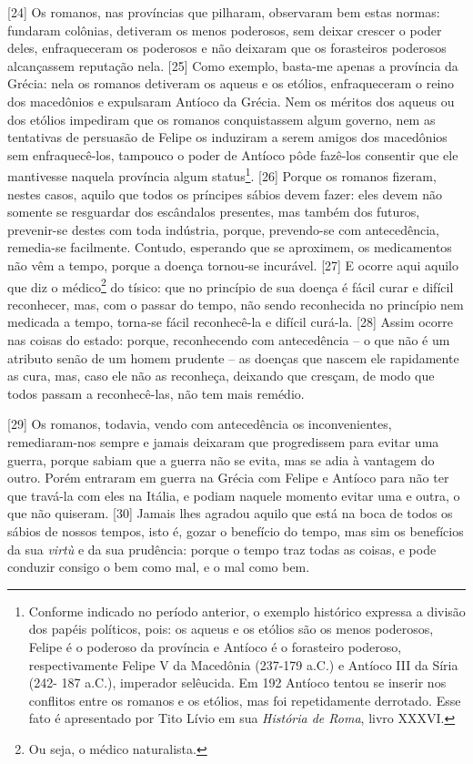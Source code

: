 {[}24{]} Os romanos, nas províncias que pilharam, observaram bem estas
normas: fundaram colônias, detiveram os menos poderosos, sem deixar
crescer o poder deles, enfraqueceram os poderosos e não deixaram que os
forasteiros poderosos alcançassem reputação nela. {[}25{]} Como exemplo,
basta-me apenas a província da Grécia: nela os romanos detiveram os
aqueus e os etólios, enfraqueceram o reino dos macedônios e expulsaram
Antíoco da Grécia. Nem os méritos dos aqueus ou dos etólios impediram
que os romanos conquistassem algum governo, nem as tentativas de
persuasão de Felipe os induziram a serem amigos dos macedônios sem
enfraquecê-los, tampouco o poder de Antíoco pôde fazê-los consentir que
ele mantivesse naquela província algum status\footnote{Conforme indicado
  no período anterior, o exemplo histórico expressa a divisão dos papéis
  políticos, pois: os aqueus e os etólios são os menos poderosos, Felipe
  é o poderoso da província e Antíoco é o forasteiro poderoso,
  respectivamente Felipe V da Macedônia (237-179 a.C.) e Antíoco III da
  Síria (242- 187 a.C.), imperador selêucida. Em 192 Antíoco tentou se
  inserir nos conflitos entre os romanos e os etólios, mas foi
  repetidamente derrotado. Esse fato é apresentado por Tito Lívio em sua
  \emph{História de Roma}, livro XXXVI.}. {[}26{]} Porque os romanos
fizeram, nestes casos, aquilo que todos os príncipes sábios devem fazer:
eles devem não somente se resguardar dos escândalos presentes, mas
também dos futuros, prevenir-se destes com toda indústria, porque,
prevendo-se com antecedência, remedia-se facilmente. Contudo, esperando
que se aproximem, os medicamentos não vêm a tempo, porque a doença
tornou-se incurável. {[}27{]} E ocorre aqui aquilo que diz o
médico\footnote{Ou seja, o médico naturalista.} do tísico: que no
princípio de sua doença é fácil curar e difícil reconhecer, mas, com o
passar do tempo, não sendo reconhecida no princípio nem medicada a
tempo, torna-se fácil reconhecê-la e difícil curá-la. {[}28{]} Assim
ocorre nas coisas do estado: porque, reconhecendo com antecedência -- o
que não é um atributo senão de um homem prudente -- as doenças que
nascem ele rapidamente as cura, mas, caso ele não as reconheça, deixando
que cresçam, de modo que todos passam a reconhecê-las, não tem mais
remédio.

{[}29{]} Os romanos, todavia, vendo com antecedência os inconvenientes,
remediaram-nos sempre e jamais deixaram que progredissem para evitar uma
guerra, porque sabiam que a guerra não se evita, mas se adia à vantagem
do outro. Porém entraram em guerra na Grécia com Felipe e Antíoco para
não ter que travá-la com eles na Itália, e podiam naquele momento evitar
uma e outra, o que não quiseram. {[}30{]} Jamais lhes agradou aquilo que
está na boca de todos os sábios de nossos tempos, isto é, gozar o
benefício do tempo, mas sim os benefícios da sua \emph{virtù} e da sua
prudência: porque o tempo traz todas as coisas, e pode conduzir consigo
o bem como mal, e o mal como bem.

